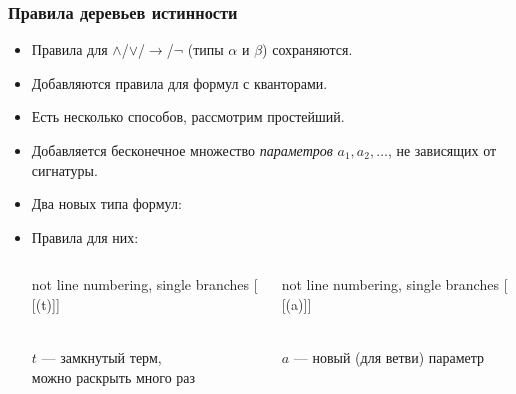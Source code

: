 \documentclass[10pt]{beamer}
\begin{document}
\begin{frame}
\frametitle{Правила деревьев истинности}
\begin{itemize}
    \item Правила для $\land$/$\lor$/$\to$/$\neg$ (типы $\alpha$ и $\beta$) сохраняются.
    \item Добавляются правила для формул с кванторами.
    \item Есть несколько способов, рассмотрим простейший.
    \item Добавляется бесконечное множество \emph{параметров} $a_1,a_2,\ldots$, не зависящих от сигнатуры.
    \item Два новых типа формул: \pause
    \item Правила для них: \pause
\begin{columns}
    \begin{column}{0.5\textwidth}
        \begin{center}
            \begin{tableau}{not line numbering, single branches}
                [{\gamma} [\gamma(t)]]
            \end{tableau}\\
            \vspace{0.5em}
            $t$ --- замкнутый терм,\\ можно раскрыть много раз
        \end{center}
    \end{column} \pause
    \begin{column}{0.5\textwidth}
        \begin{center}
            \begin{tableau}{not line numbering, single branches}
                [{\delta} [\delta(a)]]
            \end{tableau}\\
        \vspace{0.5em}
        $a$ --- новый (для ветви) параметр
        \end{center}
    \end{column}
\end{columns}
\end{itemize}
\end{frame}
\end{document}
